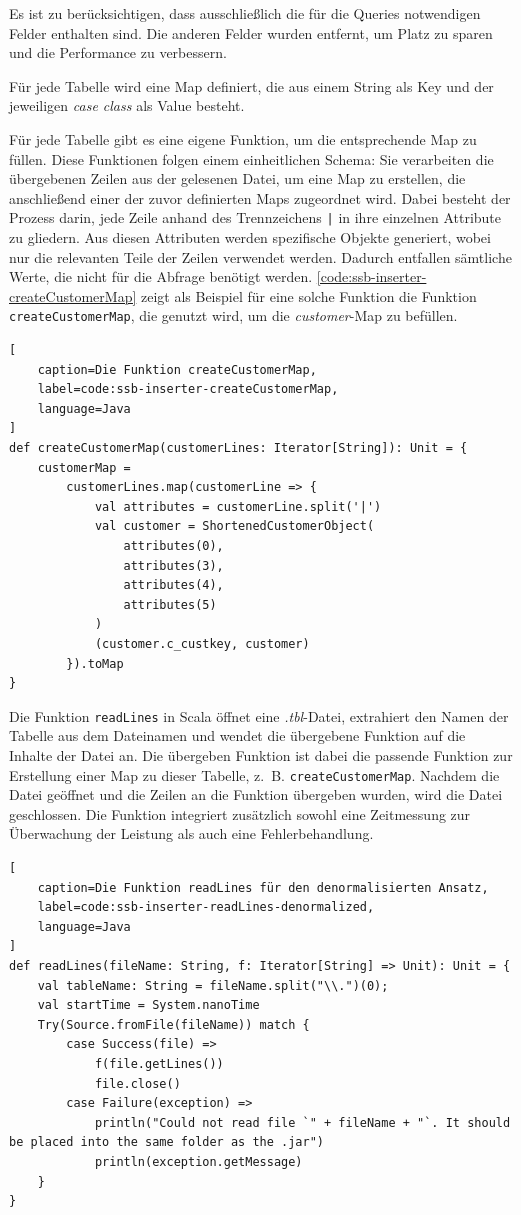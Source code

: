 Es ist zu berücksichtigen, dass ausschließlich die für die Queries notwendigen Felder enthalten sind. Die anderen Felder wurden entfernt, um Platz zu sparen und die Performance zu verbessern.

Für jede Tabelle wird eine Map definiert, die aus einem String als Key und der jeweiligen \emph{case class} als Value besteht.

Für jede Tabelle gibt es eine eigene Funktion, um die entsprechende Map zu füllen. Diese Funktionen folgen einem einheitlichen Schema: Sie verarbeiten die übergebenen Zeilen aus der gelesenen Datei, um eine Map zu erstellen, die anschließend einer der zuvor definierten Maps zugeordnet wird. Dabei besteht der Prozess darin, jede Zeile anhand des Trennzeichens \lstinline+|+ in ihre einzelnen Attribute zu gliedern. Aus diesen Attributen werden spezifische Objekte generiert, wobei nur die relevanten Teile der Zeilen verwendet werden. Dadurch entfallen sämtliche Werte, die nicht für die Abfrage benötigt werden. \cref{code:ssb-inserter-createCustomerMap} zeigt als Beispiel für eine solche Funktion die Funktion  \lstinline|createCustomerMap|, die genutzt wird, um die \emph{customer}-Map zu befüllen.

\begin{lstlisting}[
    caption=Die Funktion createCustomerMap,
    label=code:ssb-inserter-createCustomerMap,
    language=Java
]
def createCustomerMap(customerLines: Iterator[String]): Unit = {
	customerMap =
		customerLines.map(customerLine => {
			val attributes = customerLine.split('|')
			val customer = ShortenedCustomerObject(
				attributes(0),
				attributes(3),
				attributes(4),
				attributes(5)
			)
			(customer.c_custkey, customer)
		}).toMap
}
\end{lstlisting}


Die Funktion \lstinline|readLines| in Scala öffnet eine \emph{.tbl}-Datei, extrahiert den Namen der Tabelle aus dem Dateinamen und wendet die übergebene Funktion auf die Inhalte der Datei an. Die übergeben Funktion ist dabei die passende Funktion zur Erstellung einer Map zu dieser Tabelle, z.~B. \lstinline|createCustomerMap|. Nachdem die Datei geöffnet und die Zeilen an die Funktion übergeben wurden, wird die Datei geschlossen. Die Funktion integriert zusätzlich sowohl eine Zeitmessung zur Überwachung der Leistung als auch eine Fehlerbehandlung.

\begin{lstlisting}[
    caption=Die Funktion readLines für den denormalisierten Ansatz,
    label=code:ssb-inserter-readLines-denormalized,
    language=Java
]
def readLines(fileName: String, f: Iterator[String] => Unit): Unit = {
	val tableName: String = fileName.split("\\.")(0);
	val startTime = System.nanoTime
	Try(Source.fromFile(fileName)) match {
		case Success(file) =>
			f(file.getLines())
			file.close()
		case Failure(exception) =>
			println("Could not read file `" + fileName + "`. It should be placed into the same folder as the .jar")
			println(exception.getMessage)
	}
}
\end{lstlisting}

